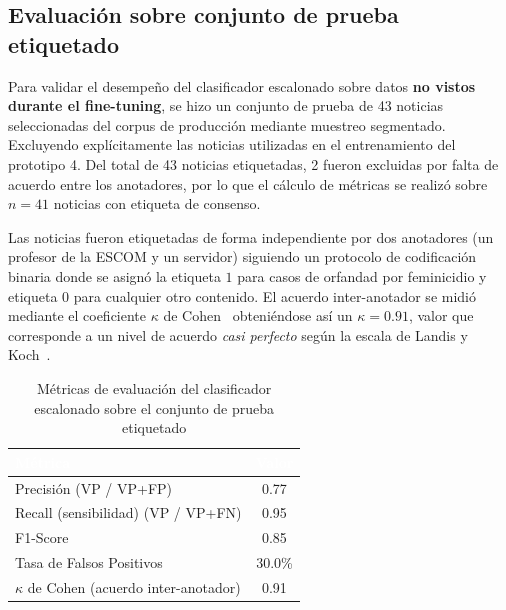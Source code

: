 \subsection{Evaluación sobre conjunto de prueba etiquetado}
\label{subsec:res_metricas_clasificador}

Para validar el desempeño del clasificador escalonado sobre datos \textbf{no vistos
durante el fine-tuning}, se hizo un conjunto de prueba de 43 noticias
seleccionadas del corpus de producción mediante muestreo segmentado.
Excluyendo explícitamente las noticias utilizadas en el entrenamiento del
prototipo 4. Del total de 43 noticias etiquetadas, 2 fueron excluidas por
falta de acuerdo entre los anotadores, por lo que el cálculo de métricas se
realizó sobre $n = 41$ noticias con etiqueta de consenso.

Las noticias fueron etiquetadas de forma independiente por dos anotadores
(un profesor de la ESCOM y un servidor) siguiendo un protocolo de codificación
binaria donde se asignó la etiqueta $1$ para casos de orfandad por
feminicidio y etiqueta $0$ para cualquier otro contenido.
El acuerdo inter-anotador se midió mediante el coeficiente
$\kappa$ de Cohen~\cite{cohen1960coefficient} obteniéndose así un $\kappa = 0.91$,
valor que corresponde a un nivel de acuerdo \textit{casi perfecto} según la
escala de Landis y Koch~\cite{landis1977measurement}.

\vspace{0.5cm}
\begin{table}[htbp]
\centering
\caption{Métricas de evaluación del clasificador escalonado sobre el
conjunto de prueba etiquetado}
\label{tab:metricas_clasificador}
\renewcommand{\arraystretch}{1.3}
\begin{tabular}{|l|c|}
\hline
\rowcolor{black}
\textcolor{white}{\textbf{Métrica}} & \textcolor{white}{\textbf{Valor}} \\
\hline
Precisión (VP / VP+FP) & 0.77 \\
\hline
Recall (sensibilidad) (VP / VP+FN) & 0.95 \\
\hline
F1-Score & 0.85 \\
\hline
Tasa de Falsos Positivos & 30.0\% \\
\hline
$\kappa$ de Cohen (acuerdo inter-anotador) & 0.91 \\
\hline
\end{tabular}
\end{table}
\vspace{0.4cm}

